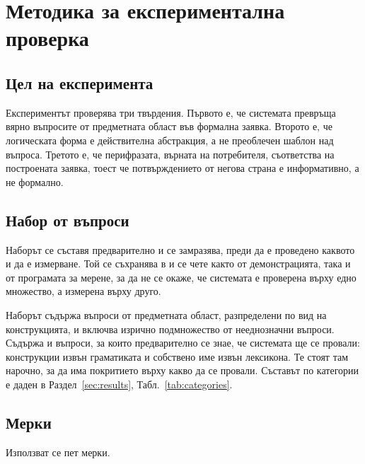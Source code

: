 \section{Методика за експериментална проверка}
\label{sec:method}

\subsection{Цел на експеримента}

Експериментът проверява три твърдения. Първото е, че системата превръща вярно въпросите
от предметната област във формална заявка. Второто е, че логическата форма е
действителна абстракция, а не преоблечен шаблон над въпроса. Третото е, че перифразата,
върната на потребителя, съответства на построената заявка, тоест че потвърждението от
негова страна е информативно, а не формално.

\subsection{Набор от въпроси}

Наборът се съставя предварително и се замразява, преди да е проведено каквото и да е
измерване. Той се съхранява в  и се чете както от демонстрацията,
така и от програмата за мерене, за да не се окаже, че системата е проверена върху едно
множество, а измерена върху друго.

Наборът съдържа въпроси от предметната област, разпределени по вид на конструкцията, и
включва изрично подмножество от нееднозначни въпроси. Съдържа и въпроси, за които
предварително се знае, че системата ще се провали: конструкции извън граматиката и
собствено име извън лексикона. Те стоят там нарочно, за да има покритието върху какво да
се провали. Съставът по категории е даден в Раздел~\ref{sec:results}, Табл.~\ref{tab:categories}.

\subsection{Мерки}

Използват се пет мерки.

